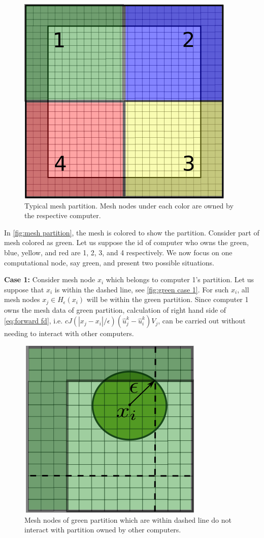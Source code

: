\documentclass[11pt,twocolumn]{amsart}
\theoremstyle{definition}
\theoremstyle{definition}
\numberwithin{equation}{section}
\numberwithin{equation}{section}
\begin{document}
\begin{figure}
\centering
\includegraphics[scale=0.6]{mesh_partition.png}
\caption{Typical mesh partition. Mesh nodes under each color are owned by the respective computer.}\label{fig:mesh partition}
\end{figure}

In \autoref{fig:mesh partition}, the mesh is colored to show the partition. Consider part of mesh colored as green. Let us suppose the id of computer who owns the green, blue, yellow, and red are 1, 2, 3, and 4 respectively. We now focus on one computational node, say green, and present two possible situations.

\textbf{Case 1: }Consider mesh node $x_i$ which belongs to computer 1's partition. Let us suppose that $x_i$ is within the dashed line, see \autoref{fig:green case 1}. For such $x_i$, all mesh nodes $x_j \in H_\epsilon(x_i)$  will be within the green partition. Since computer 1 owns the mesh data of green partition, calculation of right hand side of \autoref{eq:forward fd}, i.e. $c J(|x_j - x_i|/\epsilon)(\hat{u}^k_j - \hat{u}^k_i)V_j$, can be carried out without needing to interact with other computers. 

\begin{figure}[ht]
\centering
\includegraphics[scale=0.5]{mesh_partition_green_case_1.png}
\caption{Mesh nodes of green partition which are within dashed line do not interact with partition owned by other computers.}\label{fig:green case 1}
\end{figure}
\end{document}
